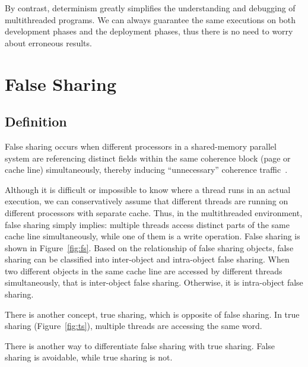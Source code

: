 By contrast, determinism greatly simplifies the understanding and debugging of multithreaded programs. We can always guarantee the same executions on both development phases and the deployment phases, thus there is no need to worry about erroneous results. 

\section{False Sharing}
\label{sec:falsesharingproblems}

\subsection{Definition}
False sharing occurs when different processors in a shared-memory parallel system are referencing distinct fields within the same coherence block (page or cache line) simultaneously, thereby inducing ``unnecessary'' coherence traffic~\cite{Bolosky:1993:FSE:1295480.1295483}. 

Although it is difficult or impossible to know where a thread runs in an actual execution, we can conservatively assume that different threads are running on different processors with separate cache. Thus, in the multithreaded environment, false sharing simply implies: multiple threads access distinct parts of the same cache line simultaneously, while one of them is a write operation. False sharing is shown in Figure~\ref{fig:fs}. 
Based on the relationship of false sharing objects, 
false sharing can be classified into inter-object and intra-object false sharing. When two different objects in the same cache line are accessed by different threads simultaneously, that is inter-object false sharing. Otherwise, it is intra-object false sharing. 

There is another concept, true sharing, which is opposite of false sharing. In true sharing (Figure~\ref{fig:ts}), multiple threads are accessing the same word. 

There is another way to differentiate false sharing with true sharing. False sharing is avoidable, while true sharing is not. 

